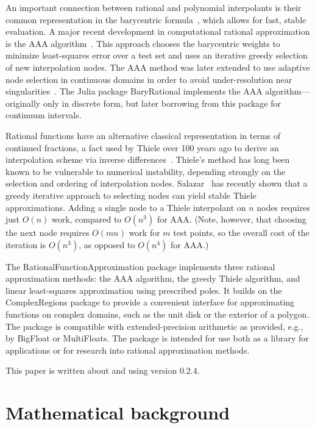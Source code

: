 \documentclass{juliacon}
\begin{document}
An important connection between rational and polynomial interpolants is their common representation in the barycentric formula~\cite{berrutBarycentricLagrange2004,schneiderNewAspects1986}, which allows for fast, stable evaluation. A major recent development in computational rational approximation is the AAA algorithm~\cite{nakatsukasaAAAAlgorithm2018}. This approach chooses the barycentric weights to minimize least-squares error over a test set and uses an iterative greedy selection of new interpolation nodes. The AAA method was later extended to use adaptive node selection in continuous domains in order to avoid under-resolution near singularities~\cite{driscollAAARational2024}. The Julia package \textsf{BaryRational} implements the AAA algorithm---originally only in discrete form, but later borrowing from this package for continuum intervals.

Rational functions have an alternative classical representation in terms of continued fractions, a fact used by Thiele over 100 years ago to derive an interpolation scheme via inverse differences~\cite{milne-thompsonCalculusFinite1933}. Thiele's method has long been known to be vulnerable to numerical instability, depending strongly on the selection and ordering of interpolation nodes. Salazar~\cite{celisAdaptiveThiele2023,celisNumericalContinued2024} has recently shown that a greedy iterative approach to selecting nodes can yield stable Thiele approximations. Adding a single node to a Thiele interpolant on $n$ nodes requires just $O(n)$ work, compared to $O(n^3)$ for AAA. (Note, however, that choosing the next node requires $O(mn)$ work for $m$ test points, so the overall cost of the iteration is $O(n^3)$, as opposed to $O(n^4)$ for AAA.)

The \textsf{RationalFunctionApproximation} package implements three rational approximation methods: the AAA algorithm, the greedy Thiele algorithm, and linear least-squares approximation using prescribed poles. It builds on the \textsf{ComplexRegions} package to provide a convenient interface for approximating functions on complex domains, such as the unit disk or the exterior of a polygon. The package is compatible with extended-precision arithmetic as provided, e.g., by \textsf{BigFloat} or \textsf{MultiFloats}. The package is intended for use both as a library for applications or for research into rational approximation methods.

This paper is written about and using version 0.2.4. 

\section{Mathematical background}
\label{sec:math}
\end{document}
